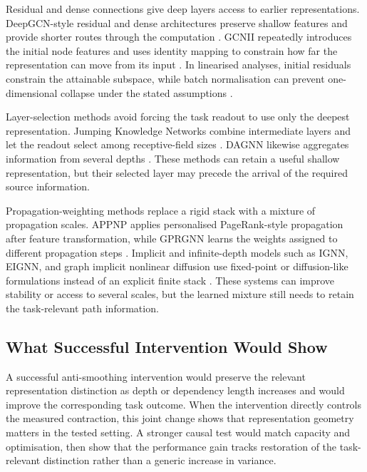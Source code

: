 Residual and dense connections give deep layers access to earlier representations.
DeepGCN-style residual and dense architectures preserve shallow features and provide shorter routes through the computation \cite{li2019deepgcns,he2015resnet}.
GCNII repeatedly introduces the initial node features and uses identity mapping to constrain how far the representation can move from its input \cite{chen2020simple}.
In linearised analyses, initial residuals constrain the attainable subspace, while batch normalisation can prevent one-dimensional collapse under the stated assumptions \cite{scholkemper2025residual}.

Layer-selection methods avoid forcing the task readout to use only the deepest representation.
Jumping Knowledge Networks combine intermediate layers and let the readout select among receptive-field sizes \cite{xu2018jknet}.
DAGNN likewise aggregates information from several depths \cite{liu2020dagnn}.
These methods can retain a useful shallow representation, but their selected layer may precede the arrival of the required source information.

Propagation-weighting methods replace a rigid stack with a mixture of propagation scales.
APPNP applies personalised PageRank-style propagation after feature transformation, while GPRGNN learns the weights assigned to different propagation steps \cite{gasteiger2019appnp,chien2021adaptive}.
Implicit and infinite-depth models such as IGNN, EIGNN, and graph implicit nonlinear diffusion use fixed-point or diffusion-like formulations instead of an explicit finite stack \cite{gu2020implicit,liu2021eignn,chen2022optimization}.
These systems can improve stability or access to several scales, but the learned mixture still needs to retain the task-relevant path information.

\subsection{What Successful Intervention Would Show}

A successful anti-smoothing intervention would preserve the relevant representation distinction as depth or dependency length increases and would improve the corresponding task outcome.
When the intervention directly controls the measured contraction, this joint change shows that representation geometry matters in the tested setting.
A stronger causal test would match capacity and optimisation, then show that the performance gain tracks restoration of the task-relevant distinction rather than a generic increase in variance.

